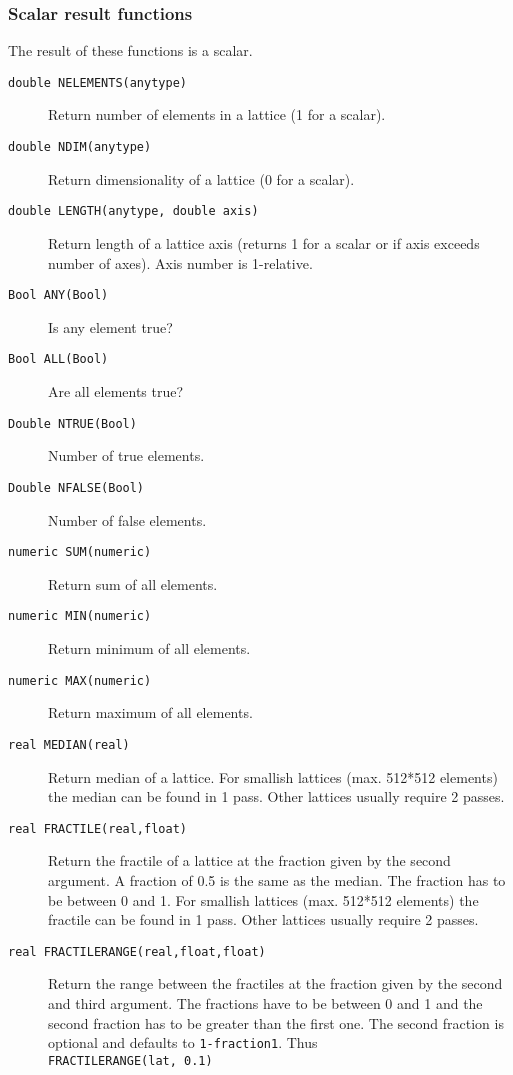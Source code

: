 \subsubsection{Scalar result functions}
The result of these functions is a scalar.
\begin{description}
  \item[ \texttt{double NELEMENTS(anytype)}]
    Return number of elements in a lattice (1 for a scalar).
  \item[ \texttt{double NDIM(anytype)}]
    Return dimensionality of a lattice (0 for a scalar).
  \item[ \texttt{double LENGTH(anytype, double axis)}]
    Return length of a lattice axis (returns 1 for a scalar or if axis
    exceeds number of axes). Axis number is 1-relative.
  \item[ \texttt{Bool ANY(Bool)}] Is any element true?
  \item[ \texttt{Bool ALL(Bool)}] Are all elements true?
  \item[ \texttt{Double NTRUE(Bool)}] Number of true elements.
  \item[ \texttt{Double NFALSE(Bool)}] Number of false elements.
  \item[ \texttt{numeric SUM(numeric)}] Return sum of all elements.
  \item[ \texttt{numeric MIN(numeric)}] Return minimum
    of all elements.
  \item[ \texttt{numeric MAX(numeric)}] Return maximum
    of all elements.
  \item[ \texttt{real MEDIAN(real)}]
    Return median of a lattice. For smallish lattices
    (max. 512*512 elements) the median can be found in 1 pass.
    Other lattices usually require 2 passes.
  \item[ \texttt{real FRACTILE(real,float)}]
    Return the fractile of a lattice at the fraction given by the second
    argument. A fraction of 0.5 is the same as the median.
    The fraction has to be between 0 and 1.
    For smallish lattices (max. 512*512 elements) the fractile can be
    found in 1 pass. Other lattices usually require 2 passes.
  \item[ \texttt{real FRACTILERANGE(real,float,float)}]
    Return the range between the fractiles at the fraction given by
    the second and third argument.
    The fractions have to be between 0 and 1 and the second fraction
    has to be greater than the first one.
    The second fraction is optional and defaults to \texttt{1-fraction1}.
    Thus
    \\\texttt{FRACTILERANGE(lat, 0.1)}

\end{description}
